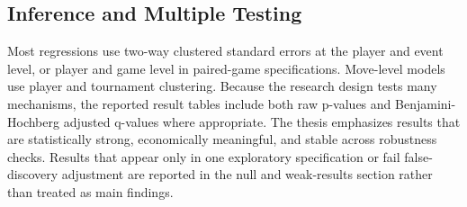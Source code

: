 \subsection{Inference and Multiple Testing}

Most regressions use two-way clustered standard errors at the player and event level, or player and game level in paired-game specifications. Move-level models use player and tournament clustering. Because the research design tests many mechanisms, the reported result tables include both raw p-values and Benjamini-Hochberg adjusted q-values where appropriate. The thesis emphasizes results that are statistically strong, economically meaningful, and stable across robustness checks. Results that appear only in one exploratory specification or fail false-discovery adjustment are reported in the null and weak-results section rather than treated as main findings.
